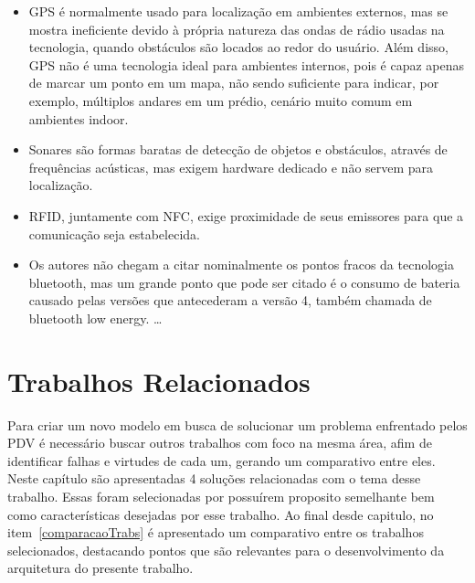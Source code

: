 \documentclass[english,brazilian]{UNISINOSmonografia}
\begin{document}
\begin{itemize}
  \item GPS é normalmente usado para localização em ambientes externos, mas se mostra ineficiente devido à própria natureza das ondas de rádio usadas na tecnologia, quando obstáculos são locados ao redor do usuário. Além disso, GPS não é uma tecnologia ideal para ambientes internos, pois é capaz apenas de marcar um ponto em um mapa, não sendo suficiente para indicar, por exemplo, múltiplos andares em um prédio, cenário muito comum em ambientes indoor. 
  \item Sonares são formas baratas de detecção de objetos e obstáculos, através de frequências acústicas, mas exigem hardware dedicado e não servem para localização.
  \item RFID, juntamente com NFC, exige proximidade de seus emissores para que a comunicação seja estabelecida.
  \item Os autores não chegam a citar nominalmente os pontos fracos da tecnologia bluetooth, mas um grande ponto que pode ser citado é o consumo de bateria causado pelas versões que antecederam a versão 4, também chamada de bluetooth low energy.    \ldots
\end{itemize}


\chapter{Trabalhos Relacionados}


Para criar um novo modelo em busca de solucionar um problema enfrentado pelos PDV é necessário buscar outros trabalhos com foco na mesma área, afim de identificar falhas e virtudes de cada um, gerando um comparativo entre eles. Neste capítulo são apresentadas 4 soluções relacionadas com o tema desse trabalho. Essas foram selecionadas por possuírem proposito semelhante bem como características desejadas por esse trabalho. Ao final desde capitulo, no item~\ref{comparacaoTrabs} é apresentado um comparativo entre os trabalhos selecionados, destacando pontos que são relevantes para o desenvolvimento da arquitetura do presente trabalho.
\end{document}
